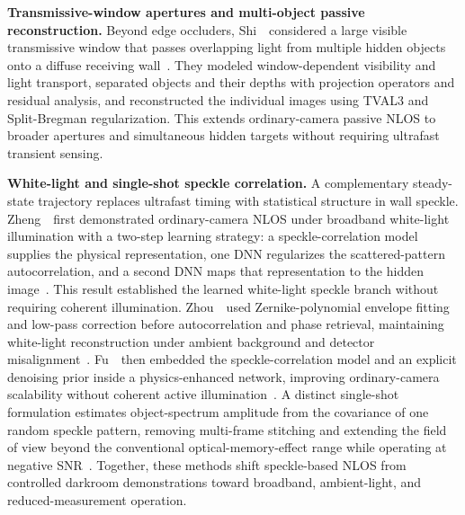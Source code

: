 \vspace{0.8mm}
\noindent \textbf{Transmissive-window apertures and multi-object passive reconstruction.}
Beyond edge occluders, Shi~\etal~considered a large visible transmissive window that passes overlapping light from multiple hidden objects onto a diffuse receiving wall~\cite{shiTransmissiveWindowMultiObject2024}. They modeled window-dependent visibility and light transport, separated objects and their depths with projection operators and residual analysis, and reconstructed the individual images using TVAL3 and Split-Bregman regularization. This extends ordinary-camera passive NLOS to broader apertures and simultaneous hidden targets without requiring ultrafast transient sensing.

\vspace{0.8mm}
\noindent \textbf{White-light and single-shot speckle correlation.}
A complementary steady-state trajectory replaces ultrafast timing with statistical structure in wall speckle. Zheng~\etal~first demonstrated ordinary-camera NLOS under broadband white-light illumination with a two-step learning strategy: a speckle-correlation model supplies the physical representation, one DNN regularizes the scattered-pattern autocorrelation, and a second DNN maps that representation to the hidden image~\cite{zhengWhiteLightTwoStepNLOS2021}. This result established the learned white-light speckle branch without requiring coherent illumination. Zhou~\etal~used Zernike-polynomial envelope fitting and low-pass correction before autocorrelation and phase retrieval, maintaining white-light reconstruction under ambient background and detector misalignment~\cite{zhouWhiteLightSpeckleNLOS2024}. Fu~\etal~then embedded the speckle-correlation model and an explicit denoising prior inside a physics-enhanced network, improving ordinary-camera scalability without coherent active illumination~\cite{fuPhysicsEnhancedWhiteLightNLOS2025}. A distinct single-shot formulation estimates object-spectrum amplitude from the covariance of one random speckle pattern, removing multi-frame stitching and extending the field of view beyond the conventional optical-memory-effect range while operating at negative SNR~\cite{zhouSingleShotSpeckleNLOS2025}. Together, these methods shift speckle-based NLOS from controlled darkroom demonstrations toward broadband, ambient-light, and reduced-measurement operation.

